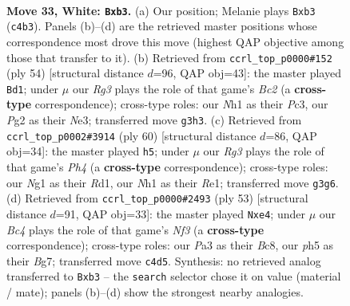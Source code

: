 \documentclass[11pt]{article}
\begin{document}
\clearpage

\begin{figure}[p]\centering
\begin{subfigure}{0.46\textwidth}\centering
\resizebox{\linewidth}{!}{%
\newchessgame
\chessboard[
  setfen={1r3b2/2nkn1pr/6b1/7p/2B1pP1P/Pp4R1/6P1/R2K2NN w - - 0 33},
  showmover=false,
  pgfstyle=straightmove, color=movearrow, markmove={c4-b3}
]}
\caption{}
\end{subfigure}\hfill
\begin{subfigure}{0.46\textwidth}\centering
\resizebox{\linewidth}{!}{%
\newchessgame
\chessboard[
  setfen={4r3/2rn1pkp/2b3p1/1p6/3Rp2P/2P1N3/1PB2PP1/R5K1 w - - 3 28},
  showmover=false,
  pgfstyle=straightmove, color=movearrow, markmove={c2-d1}
]}
\caption{}
\end{subfigure}
\\[4pt]
\begin{subfigure}{0.46\textwidth}\centering
\resizebox{\linewidth}{!}{%
\newchessgame
\chessboard[
  setfen={1r3b1r/2k2p2/B3pP1p/6p1/Pp2N1nP/8/1PP3K1/3RR3 w - - 0 31},
  showmover=false,
  pgfstyle=straightmove, color=movearrow, markmove={h4-h5}
]}
\caption{}
\end{subfigure}\hfill
\begin{subfigure}{0.46\textwidth}\centering
\resizebox{\linewidth}{!}{%
\newchessgame
\chessboard[
  setfen={2br2k1/5pbp/5np1/p1N5/1r2P3/1P3BP1/7P/R1R3BK b - - 0 27},
  showmover=false,
  pgfstyle=straightmove, color=movearrow, markmove={f6-e4}
]}
\caption{}
\end{subfigure}
\caption{\textbf{Move 33, White: \texttt{Bxb3}.} (a) Our position; Melanie plays \texttt{Bxb3} (\texttt{c4b3}). Panels (b)--(d) are the retrieved master positions whose correspondence most drove this move (highest QAP objective among those that transfer to it). (b) Retrieved from \texttt{ccrl\_top\_p0000\#152} (ply 54) [structural distance $d$=96, QAP obj=43]: the master played \texttt{Bd1}; under $\mu$ our \emph{Rg3} plays the role of that game's \emph{Bc2} (a \textbf{cross-type} correspondence); cross-type roles: our \emph{N}h1 as their \emph{P}c3, our \emph{P}g2 as their \emph{N}e3; transferred move \texttt{g3h3}. (c) Retrieved from \texttt{ccrl\_top\_p0002\#3914} (ply 60) [structural distance $d$=86, QAP obj=34]: the master played \texttt{h5}; under $\mu$ our \emph{Rg3} plays the role of that game's \emph{Ph4} (a \textbf{cross-type} correspondence); cross-type roles: our \emph{N}g1 as their \emph{R}d1, our \emph{N}h1 as their \emph{R}e1; transferred move \texttt{g3g6}. (d) Retrieved from \texttt{ccrl\_top\_p0000\#2493} (ply 53) [structural distance $d$=91, QAP obj=33]: the master played \texttt{Nxe4}; under $\mu$ our \emph{Bc4} plays the role of that game's \emph{Nf3} (a \textbf{cross-type} correspondence); cross-type roles: our \emph{P}a3 as their \emph{B}c8, our \emph{p}h5 as their \emph{B}g7; transferred move \texttt{c4d5}. Synthesis: no retrieved analog transferred to \texttt{Bxb3} -- the \texttt{search} selector chose it on value (material / mate); panels (b)--(d) show the strongest nearby analogies.}
\label{fig:thought-m64}
\end{figure}
\end{document}
